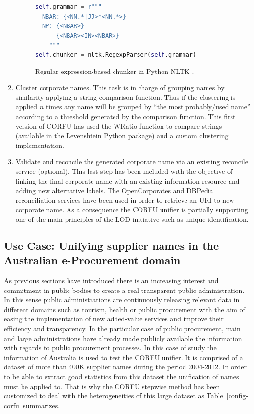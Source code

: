 \documentclass{llncs}
\begin{document}
\begin{enumerate}

\begin{figure}[!h]
\begin{center}
\begin{lstlisting}[language=Python]  
self.grammar = r"""
  NBAR: {<NN.*|JJ>*<NN.*>}   
  NP: {<NBAR>}
      {<NBAR><IN><NBAR>} 
    """
self.chunker = nltk.RegexpParser(self.grammar)
\end{lstlisting}
\caption{Regular expression-based chunker in Python NLTK .}
\label{figure:step-4}
\end{center}
\end{figure}   

\item Cluster corporate names. This task is in charge of grouping names by similarity applying 
a string comparison function. Thus if the clustering is applied $n$ times any name 
will be grouped by ``the most probably/used name'' according to a threshold generated 
by the comparison function. This first version of CORFU has used the WRatio function to 
compare strings (available in the Levenshtein Python package) and a custom clustering 
implementation.

\item Validate and reconcile the generated corporate name via an existing reconcile service (optional). This last 
step has been included with the objective of linking the final corporate name with an existing information 
resource and adding new alternative labels. The OpenCorporates and DBPedia reconciliation services have 
been used in order to retrieve an URI to new corporate name. As a consequence the CORFU unifier is partially supporting 
one of the main principles of the LOD initiative such as unique identification.
\end{enumerate}
% 
%
\subsection{Use Case: Unifying supplier names in the Australian e-Procurement domain}
As previous sections have introduced there is an increasing interest and commitment 
in public bodies to create a real transparent public administration. In this sense 
public administrations are continuously releasing relevant data in different domains 
such as tourism, health or public procurement with the aim of easing the implementation 
of new added-value services and improve their efficiency and transparency. In the particular 
case of public procurement, main and large administrations have already made publicly available the information 
with regards to public procurement processes. In this case of study the information of Australia is used 
to test the CORFU unifier. It is comprised of a dataset of more than $400$K supplier names during the period 2004-2012. In order to be able to extract 
good statistics from this dataset the unification of names must be applied to. That is why 
the CORFU stepwise method has been customized to deal with the heterogeneities of this large 
dataset as Table~\ref{config-corfu} summarizes.
\end{document}
